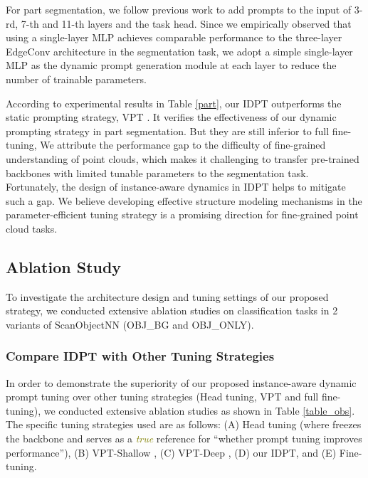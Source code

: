 \documentclass[10pt,twocolumn,letterpaper]{article}
\begin{document}
For part segmentation, we follow previous work \cite{dong2022autoencoders,pang2022masked} to add prompts to the input of 3-rd, 7-th and 11-th layers and the task head. Since we empirically observed that using a single-layer MLP achieves comparable performance to the three-layer EdgeConv architecture in the segmentation task, we adopt a simple single-layer MLP as the dynamic prompt generation module at each layer to reduce the number of trainable parameters. 

According to experimental results in Table \ref{part}, 
our IDPT outperforms the static prompting strategy, VPT \cite{jia2022visual}.
It verifies the effectiveness of our dynamic prompting strategy in part segmentation. 
But they are still inferior to full fine-tuning, We attribute the performance gap to the difficulty of fine-grained understanding of point clouds, which makes it challenging to  transfer pre-trained backbones with limited tunable parameters to the segmentation task. 
Fortunately, the design of instance-aware dynamics in IDPT helps to mitigate such a gap. 
We believe developing effective structure modeling mechanisms in the parameter-efficient tuning strategy is a promising direction for fine-grained point cloud tasks. 





\subsection{Ablation Study}

To investigate the architecture design and tuning settings of our proposed strategy, we conducted extensive ablation studies on classification tasks in 2 variants of ScanObjectNN \cite{uy2019revisiting} (OBJ\_BG and OBJ\_ONLY).

\subsubsection{Compare IDPT with Other Tuning Strategies} 
In order to demonstrate the superiority of our proposed instance-aware dynamic prompt tuning over other tuning strategies (Head tuning, VPT \cite{jia2022visual} and full fine-tuning), we conducted extensive ablation studies as shown in Table \ref{table_obs}. The specific tuning strategies used are as follows: (A) Head tuning (where freezes the backbone and serves as a \textcolor{olive}{\emph{true}} reference for ``whether prompt tuning improves performance''), (B) VPT-Shallow \cite{jia2022visual}, (C) VPT-Deep \cite{jia2022visual}, (D) our IDPT, and (E) Fine-tuning.
\end{document}
